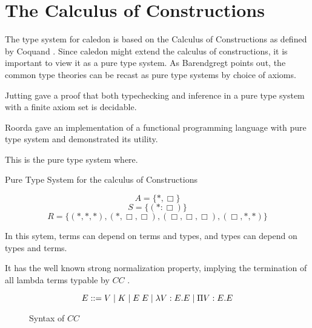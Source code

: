 \section{The Calculus of Constructions}

The type system for caledon is based on the Calculus of Constructions as defined by Coquand \citep{coquand1986calculus}.
Since caledon might extend the calculus of constructions, it is important to view it as a pure type system. 
As Barendgregt points out, the common type theories can be recast as pure type systems
by choice of axioms. 

Jutting \citep{jutting1993typing} gave a proof that both typechecking and inference
in a pure type system with a finite axiom set is decidable.

Roorda \citep{roorda2001pure} gave an implementation of a functional programming language with 
pure type system and demonstrated its utility.

This is the pure type system where.

\begin{definition}
Pure Type System for the calculus of Constructions
\end{definition}
\[
A = \{ *, \Box \}
\]
\[
S = \{ (* : \Box) \}
\]
\[ 
R = \{ (*,*,*),(*,\Box,\Box),(\Box,\Box,\Box),(\Box,*,*)\}
\]  

In this sytem, terms can depend on terms and types, 
and types can depend on types and terms.  

It has the well known strong normalization property, implying the termination of 
all lambda terms typable by $CC$ \citep{Geuvers94ashort} \citep{geuvers1991modular}.

\begin{figure}[H]

\[ 
E ::= 
V 
\; | \; K
\; | \; E\;E 
\; | \; \lambda V : E . E 
\; | \; \Pi V : E . E 
\]

\caption{ Syntax of $CC$ }
\label{coc:syntax}
\end{figure}

